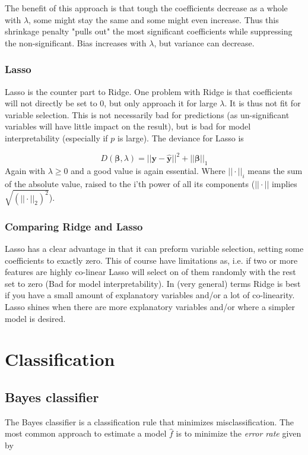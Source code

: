 \documentclass{article}
\renewcommand{\vec}[1]{\mathbf{#1}} %
\newcommand{\vecsym}[1]{\boldsymbol{#1}} %
\begin{document}
The benefit of this approach is that tough the coefficients decrease as a whole with $\lambda$, some might stay the same and some might even increase. Thus this shrinkage penalty "pulls out" the most significant coefficients while suppressing the non-significant. Bias increases with $\lambda$, but variance can decrease.       
    
\subsubsection{Lasso}
Lasso is the counter part to Ridge. One problem with Ridge is that coefficients will not directly be set to 0, but only approach it for large $\lambda$. It is thus not fit for variable selection. This is not necessarily bad for predictions (as un-significant variables will have little impact on the result), but is bad for model interpretability (especially if $p$ is large). The deviance for Lasso is

\begin{equation*}
    D(\vecsym{\beta}, \lambda) = ||\vec{y} - \hat{\vec{y}}||^2 + ||\vecsym{\beta}||_1
\end{equation*}
Again with $\lambda \geq 0$ and a good value is again essential. Where $|| \cdot ||_i$ means the sum of the absolute value, raised to the i'th power of all its components ($|| \cdot ||$ implies $\sqrt{(|| \cdot ||_{2})^2}$). 

\subsubsection{Comparing Ridge and Lasso}
Lasso has a clear advantage in that it can preform variable selection, setting some coefficients to exactly zero. This of course have limitations as, i.e. if two or more features are highly co-linear Lasso will select on of them randomly with the rest set to zero (Bad for model interpretability). In (very general) terms Ridge is best if you have a small amount of explanatory variables and/or a lot of co-linearity. Lasso shines when there  are more explanatory variables and/or where a simpler model is desired.   

\section{Classification}
\subsection{Bayes classifier}
The Bayes classifier is a classification rule that minimizes misclassification. The most common approach to estimate a model $\hat{f}$ is to minimize the \textit{error rate} given by
\end{document}

